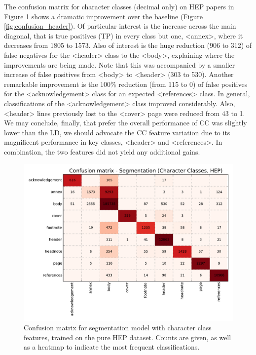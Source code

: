 The confusion matrix for character classes (decimal only) on HEP papers in Figure \ref{fig:confusion_segmentation} shows a dramatic improvement over the baseline (Figure \ref{fig:confusion_header}). Of particular interest is the increase across the main diagonal, that is true positives (TP) in every class but one, <annex>, where it decreases from 1805 to 1573. Also of interest is the huge reduction (906 to 312) of false negatives for the <header> class to the <body>, explaining where the improvements are being made. Note that this was accompanied by a smaller increase of false positives from <body> to <header> (303 to 530). Another remarkable improvement is the $100\%$ reduction (from 115 to 0) of false positives for the <acknowledgement> class for an expected <references> class. In general, classifications of the <acknowledgement> class improved considerably. Also, <header> lines previously lost to the <cover> page were reduced from 43 to 1.  We may conclude, finally, that prefer the overall performance of CC was slightly lower than the LD, we should advocate the CC feature variation due to its magnificent performance in key classes, <header> and <references>. In combination, the two features did not yield any additional gains.

\begin{figure}[h]
\center
\includegraphics[width=5.5in]{Figures/classes_confusion_segmentation.pdf}
\caption{Confusion matrix for segmentation model with character class features, trained on the pure HEP dataset. Counts are given, as well as a heatmap to indicate the most frequent classifications.}
\label{fig:confusion_segmentation}
\end{figure}


